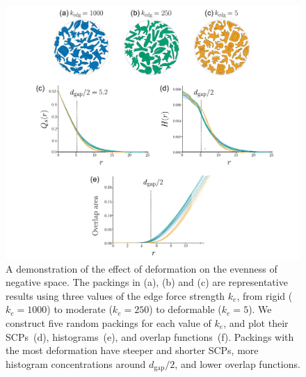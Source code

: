 \begin{figure}
\centering
\includegraphics[width=1.0\textwidth]{figures/metrics/evaluation_big.pdf}
\caption[A demonstration of the effect of deformation \newline on the evenness of negative space]
{\label{fifteen_packings}
A demonstration of the effect of deformation on the evenness of negative space.  
The packings in (a), (b) and (c) are representative results using three values of the edge force strength $k_e$,
from rigid ($k_e=1000$) to moderate ($k_e=250$) to deformable ($k_e=5$).
We construct five random packings for each value of $k_e$, and plot their SCPs~(d), histograms~(e), and overlap functions~(f).
Packings with the most deformation have steeper and shorter SCPs, 
more histogram concentrations around $d_\mathrm{gap} / 2$, and lower overlap functions.
}
\end{figure}


